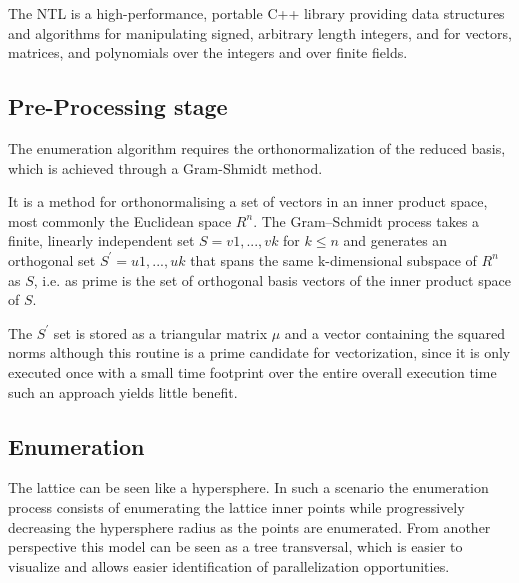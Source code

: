 \documentclass[conference]{IEEEtran}
\begin{document}
    The NTL is a high-performance, portable C++ library providing data structures and algorithms for manipulating signed, arbitrary length integers, and for vectors, matrices, and polynomials over the integers and over finite fields.


\subsection{Pre-Processing stage}

    The enumeration algorithm requires the orthonormalization of the reduced basis, which is achieved through a Gram-Shmidt method.

    It is a method for orthonormalising a set of vectors in an inner product space, most commonly the Euclidean space $R^n$. The Gram–Schmidt process takes a finite, linearly independent set $S = {v1, ..., vk}$ for $k \leqslant n$ and generates an orthogonal set $S^\prime = {u1, ..., uk}$ that spans the same k-dimensional subspace of $R^n$ as $S$, i.e. as prime is the set of orthogonal basis vectors of the inner product space of $S$.
    
    The $S^\prime$ set is stored as a triangular matrix $\mu$ and a vector containing the squared norms although this routine is a prime candidate for vectorization, since it is only executed once with a small time footprint over the entire overall execution time such an approach yields little benefit.


\subsection{Enumeration}
    The lattice can be seen like a hypersphere. In such a scenario the enumeration process consists of enumerating the lattice inner points while progressively decreasing the hypersphere radius as the points are enumerated.
    From another perspective this model can be seen as a tree transversal, which is easier to visualize and allows easier identification of parallelization opportunities.
\end{document}
